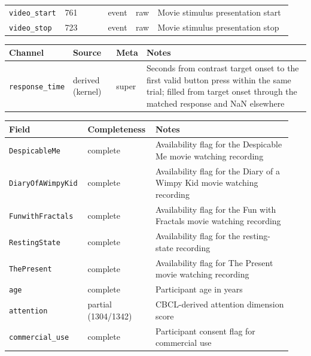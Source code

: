 {\begin{tcolorbox}
\begin{tabular}{@{}p{0.1567\linewidth}p{0.1567\linewidth}p{0.0783\linewidth}p{0.0783\linewidth}p{0.4700\linewidth}@{}}
\texttt{video\_\allowbreak{}start} & 761 & event & raw & Movie stimulus presentation start \\
\texttt{video\_\allowbreak{}stop} & 723 & event & raw & Movie stimulus presentation stop \\
\bottomrule
\end{tabular}
\endgroup
\smallskip{}\par\smallskip
\begingroup\scriptsize\setlength{\tabcolsep}{2pt}
\begin{tabular}{@{}p{}p{}p{}p{}@{}}
\toprule
\textbf{Channel} & \textbf{Source} & \textbf{Meta} & \textbf{Notes} \\
\midrule
\texttt{response\_time} & derived (kernel) & super & Seconds from contrast target onset to the first valid button press within the same trial; filled from target onset through the matched response and NaN elsewhere \\
\bottomrule
\end{tabular}
\endgroup
\smallskip{}\par\smallskip
\begingroup\scriptsize\setlength{\tabcolsep}{2pt}
\begin{tabular}{@{}p{0.2350\linewidth}p{0.2350\linewidth}p{0.4700\linewidth}@{}}
\toprule
\textbf{Field} & \textbf{Completeness} & \textbf{Notes} \\
\midrule
\texttt{DespicableMe} & complete & Availability flag for the Despicable Me movie watching recording \\
\texttt{DiaryOfAWimpyKid} & complete & Availability flag for the Diary of a Wimpy Kid movie watching recording \\
\texttt{FunwithFractals} & complete & Availability flag for the Fun with Fractals movie watching recording \\
\texttt{RestingState} & complete & Availability flag for the resting-state recording \\
\texttt{ThePresent} & complete & Availability flag for The Present movie watching recording \\
\texttt{age} & complete & Participant age in years \\
\texttt{attention} & partial (1304/1342) & CBCL-derived attention dimension score \\
\texttt{commercial\_\allowbreak{}use} & complete & Participant consent flag for commercial use \\

\end{tabular}
\end{tcolorbox}}
